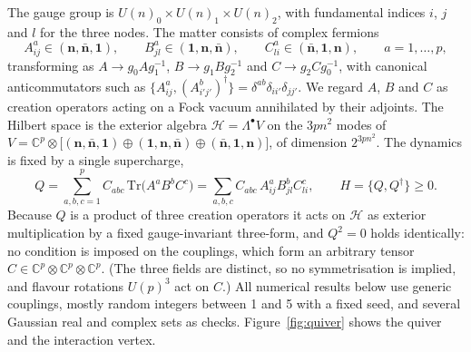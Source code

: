 \documentclass[10pt]{article}
\newcommand{\Tr}{\mathrm{Tr}}
\newcommand{\bQ}{Q^\dagger}
\begin{document}
The gauge group is $U(n)_0\times U(n)_1\times U(n)_2$, with fundamental indices $i$, $j$ and $l$ for the three
nodes. The matter consists of complex fermions
\begin{equation}
A^a_{ij}\in(\mathbf n,\bar{\mathbf n},\mathbf 1),\qquad B^a_{jl}\in(\mathbf 1,\mathbf n,\bar{\mathbf n}),\qquad
C^a_{li}\in(\bar{\mathbf n},\mathbf 1,\mathbf n),\qquad a=1,\dots,p,
\end{equation}
transforming as $A\to g_0Ag_1^{-1}$, $B\to g_1Bg_2^{-1}$ and $C\to g_2Cg_0^{-1}$, with canonical anticommutators
such as $\{A^a_{ij},(A^b_{i'j'})^\dagger\}=\delta^{ab}\delta_{ii'}\delta_{jj'}$. We regard $A$, $B$ and $C$ as
creation operators acting on a Fock vacuum annihilated by their adjoints. The Hilbert space is the exterior algebra
$\mathcal H=\Lambda^\bullet V$ on the $3pn^2$ modes of $V=\mathbb C^p\otimes\big[(\mathbf n,\bar{\mathbf n},\mathbf
1)\oplus(\mathbf 1,\mathbf n,\bar{\mathbf n})\oplus(\bar{\mathbf n},\mathbf 1,\mathbf n)\big]$, of dimension
$2^{3pn^2}$. The dynamics is fixed by a single supercharge,
\begin{equation}
Q=\sum_{a,b,c=1}^pC_{abc}\,\Tr\big(A^aB^bC^c\big)=\sum_{a,b,c}C_{abc}\,A^a_{ij}B^b_{jl}C^c_{li},\qquad
H=\{Q,\bQ\}\ge0 .
\label{eq:Q}
\end{equation}
Because $Q$ is a product of three creation operators it acts on $\mathcal H$ as exterior multiplication by a fixed
gauge-invariant three-form, and $Q^2=0$ holds identically: no condition is imposed on the couplings, which form an
arbitrary tensor $C\in\mathbb C^p\otimes\mathbb C^p\otimes\mathbb C^p$. (The three fields are distinct, so no
symmetrisation is implied, and flavour rotations $U(p)^3$ act on $C$.) All numerical results below use generic
couplings, mostly random integers between 1 and 5 with a fixed seed, and several Gaussian real and complex sets as
checks. Figure~\ref{fig:quiver} shows the quiver and the interaction vertex.
\end{document}
